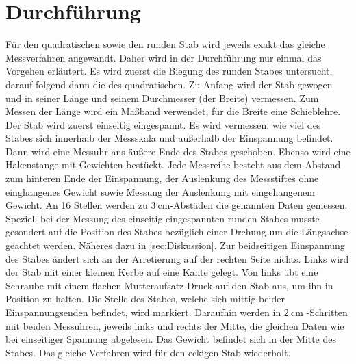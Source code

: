 \section{Durchführung}
\label{sec:Durchführung}
Für den quadratischen sowie den runden Stab wird jeweils exakt das gleiche Messverfahren 
angewandt. Daher wird in der Durchführung nur einmal das Vorgehen erläutert. 
Es wird zuerst die Biegung des runden Stabes untersucht, darauf folgend dann die 
des quadratischen. Zu Anfang wird der Stab gewogen und in seiner Länge und seinem 
Durchmesser (der Breite) vermessen. Zum Messen der Länge wird ein Maßband verwendet,
für die Breite eine Schieblehre. Der Stab wird zuerst einseitig eingespannt. Es wird 
vermessen, wie viel des Stabes sich innerhalb der Messskala und außerhalb der Einspannung 
befindet. Dann wird eine Messuhr ans äußere Ende des Stabes geschoben. Ebenso wird eine
Hakenstange mit Gewichten bestückt. Jede Messreihe besteht aus dem Abstand zum hinteren 
Ende der Einspannung, der Auslenkung des Messstiftes ohne einghangenes Gewicht sowie Messung 
der Auslenkung mit eingehangenem Gewicht. An 16 Stellen werden zu $\qty{3}{\centi\meter}$-Abstäden 
die genannten Daten gemessen. Speziell bei der Messung des einseitig eingespannten runden 
Stabes musste gesondert auf die Position des Stabes bezüglich einer Drehung um die 
Längsachse geachtet werden. Näheres dazu in \autoref{sec:Diskussion}. Zur 
beidseitigen Einspannung des Stabes ändert sich an der Arretierung auf der rechten 
Seite nichts. Links wird der Stab mit einer kleinen Kerbe auf eine Kante gelegt. 
Von links übt eine Schraube mit einem flachen Mutteraufsatz Druck auf den Stab aus,
um ihn in Position zu halten. Die Stelle des Stabes, welche sich mittig beider 
Einspannungsenden befindet, wird markiert. Daraufhin werden in $\qty{2}{\centi\meter}$
-Schritten mit beiden Messuhren, jeweils links und rechts der Mitte, die gleichen 
Daten wie bei einseitiger Spannung abgelesen. Das Gewicht befindet sich in der Mitte 
des Stabes. Das gleiche Verfahren wird für den eckigen Stab wiederholt. 